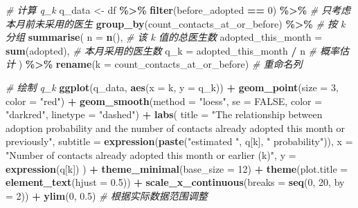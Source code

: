 \documentclass[
]{article}
\newenvironment{Shaded}{\begin{snugshade}}{\end{snugshade}}
\newcommand{\AttributeTok}[1]{\textcolor[rgb]{0.13,0.29,0.53}{#1}}
\newcommand{\CommentTok}[1]{\textcolor[rgb]{0.56,0.35,0.01}{\textit{#1}}}
\newcommand{\ConstantTok}[1]{\textcolor[rgb]{0.56,0.35,0.01}{#1}}
\newcommand{\DecValTok}[1]{\textcolor[rgb]{0.00,0.00,0.81}{#1}}
\newcommand{\FloatTok}[1]{\textcolor[rgb]{0.00,0.00,0.81}{#1}}
\newcommand{\FunctionTok}[1]{\textcolor[rgb]{0.13,0.29,0.53}{\textbf{#1}}}
\newcommand{\NormalTok}[1]{#1}
\newcommand{\OtherTok}[1]{\textcolor[rgb]{0.56,0.35,0.01}{#1}}
\newcommand{\SpecialCharTok}[1]{\textcolor[rgb]{0.81,0.36,0.00}{\textbf{#1}}}
\newcommand{\StringTok}[1]{\textcolor[rgb]{0.31,0.60,0.02}{#1}}
\begin{document}
\begin{Shaded}
\begin{Highlighting}[]
\CommentTok{\# 计算 q\_k}
\NormalTok{q\_data }\OtherTok{\textless{}{-}}\NormalTok{ df }\SpecialCharTok{\%\textgreater{}\%}
  \FunctionTok{filter}\NormalTok{(before\_adopted }\SpecialCharTok{==} \DecValTok{0}\NormalTok{) }\SpecialCharTok{\%\textgreater{}\%}  \CommentTok{\# 只考虑本月前未采用的医生}
  \FunctionTok{group\_by}\NormalTok{(count\_contacts\_at\_or\_before) }\SpecialCharTok{\%\textgreater{}\%}  \CommentTok{\# 按 k 分组}
  \FunctionTok{summarise}\NormalTok{(}
    \AttributeTok{n =} \FunctionTok{n}\NormalTok{(),  }\CommentTok{\# 该 k 值的总医生数}
    \AttributeTok{adopted\_this\_month =} \FunctionTok{sum}\NormalTok{(adopted),  }\CommentTok{\# 本月采用的医生数}
    \AttributeTok{q\_k =}\NormalTok{ adopted\_this\_month }\SpecialCharTok{/}\NormalTok{ n  }\CommentTok{\# 概率估计}
\NormalTok{  ) }\SpecialCharTok{\%\textgreater{}\%}
  \FunctionTok{rename}\NormalTok{(}\AttributeTok{k =}\NormalTok{ count\_contacts\_at\_or\_before)  }\CommentTok{\# 重命名列}

\CommentTok{\# 绘制 q\_k}
\FunctionTok{ggplot}\NormalTok{(q\_data, }\FunctionTok{aes}\NormalTok{(}\AttributeTok{x =}\NormalTok{ k, }\AttributeTok{y =}\NormalTok{ q\_k)) }\SpecialCharTok{+}
  \FunctionTok{geom\_point}\NormalTok{(}\AttributeTok{size =} \DecValTok{3}\NormalTok{, }\AttributeTok{color =} \StringTok{"red"}\NormalTok{) }\SpecialCharTok{+}
  \FunctionTok{geom\_smooth}\NormalTok{(}\AttributeTok{method =} \StringTok{"loess"}\NormalTok{, }\AttributeTok{se =} \ConstantTok{FALSE}\NormalTok{, }\AttributeTok{color =} \StringTok{"darkred"}\NormalTok{, }\AttributeTok{linetype =} \StringTok{"dashed"}\NormalTok{) }\SpecialCharTok{+}
  \FunctionTok{labs}\NormalTok{(}
    \AttributeTok{title =} \StringTok{"The relationship between adoption probability and the number of contacts already adopted this month or previously"}\NormalTok{,}
    \AttributeTok{subtitle =} \FunctionTok{expression}\NormalTok{(}\FunctionTok{paste}\NormalTok{(}\StringTok{"estimated "}\NormalTok{, q[k], }\StringTok{" probability"}\NormalTok{)),}
    \AttributeTok{x =} \StringTok{"Number of contacts already adopted this month or earlier (k)"}\NormalTok{,}
    \AttributeTok{y =} \FunctionTok{expression}\NormalTok{(q[k])}
\NormalTok{  ) }\SpecialCharTok{+}
  \FunctionTok{theme\_minimal}\NormalTok{(}\AttributeTok{base\_size =} \DecValTok{12}\NormalTok{) }\SpecialCharTok{+}
  \FunctionTok{theme}\NormalTok{(}\AttributeTok{plot.title =} \FunctionTok{element\_text}\NormalTok{(}\AttributeTok{hjust =} \FloatTok{0.5}\NormalTok{)) }\SpecialCharTok{+}
  \FunctionTok{scale\_x\_continuous}\NormalTok{(}\AttributeTok{breaks =} \FunctionTok{seq}\NormalTok{(}\DecValTok{0}\NormalTok{, }\DecValTok{20}\NormalTok{, }\AttributeTok{by =} \DecValTok{2}\NormalTok{)) }\SpecialCharTok{+}
  \FunctionTok{ylim}\NormalTok{(}\DecValTok{0}\NormalTok{, }\FloatTok{0.5}\NormalTok{)  }\CommentTok{\# 根据实际数据范围调整}
\end{Highlighting}
\end{Shaded}
\end{document}
